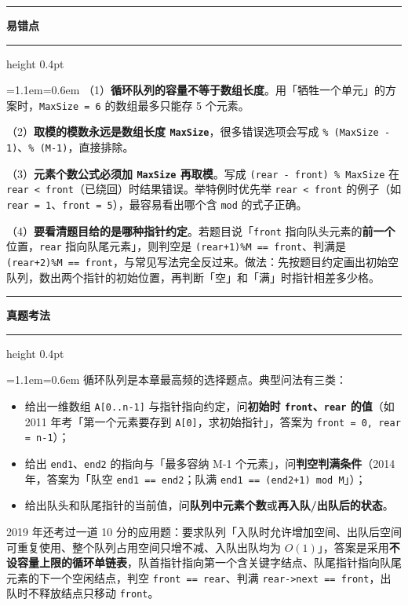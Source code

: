 \documentclass[11pt,openany,UTF8]{ctexbook}
\newcommand{\callouthead}[2]{%
  \par\addvspace{7pt}\noindent
  {\color{#1}\rule[-0.15em]{3pt}{1.05em}}\hspace{0.5em}%
  {\bfseries\color{#1}#2}\par\nobreak\vspace{-0.35em}%
  {\color{rulesep}\hrule height 0.4pt}\nobreak\vspace{0.45em}%
  \begingroup\small\setlength{\parindent}{0pt}%
  \leftskip=1.1em\rightskip=0.6em\noindent\ignorespaces}
\newcommand{\calloutend}{\par\endgroup\addvspace{7pt}}
\newenvironment{callwarn}[1]{\callouthead{warnbar}{#1}}{\calloutend}
\newenvironment{callexam}[1]{\callouthead{exambar}{#1}}{\calloutend}
\begin{document}
\begin{callwarn}{易错点}
（1）\textbf{循环队列的容量不等于数组长度}。用「牺牲一个单元」的方案时，\texttt{MaxSize =\allowbreak{} 6} 的数组最多只能存 5 个元素。

（2）\textbf{取模的模数永远是数组长度 \texttt{MaxSize}}，很多错误选项会写成 \texttt{\% (MaxSize - 1)\allowbreak{}}、\texttt{\% (M-1)\allowbreak{}}，直接排除。

（3）\textbf{元素个数公式必须加 \texttt{MaxSize} 再取模}。写成 \texttt{(rear - front)\allowbreak{} \% MaxSize} 在 \texttt{rear <\allowbreak{} front}（已绕回）时结果错误。举特例时优先举 \texttt{rear <\allowbreak{} front} 的例子（如 \texttt{rear =\allowbreak{} 1}、\texttt{front =\allowbreak{} 5}），最容易看出哪个含 \texttt{mod} 的式子正确。

（4）\textbf{要看清题目给的是哪种指针约定}。若题目说「\texttt{front} 指向队头元素的\textbf{前一个}位置，\texttt{rear} 指向队尾元素」，则判空是 \texttt{(rear+\allowbreak{}1)\allowbreak{}\%M =\allowbreak{}=\allowbreak{} front}、判满是 \texttt{(rear+\allowbreak{}2)\allowbreak{}\%M =\allowbreak{}=\allowbreak{} front}，与常见写法完全反过来。做法：先按题目约定画出初始空队列，数出两个指针的初始位置，再判断「空」和「满」时指针相差多少格。

\end{callwarn}

\begin{callexam}{真题考法}
循环队列是本章最高频的选择题点。典型问法有三类：

\begin{itemize}
\item 给出一维数组 \texttt{A[0..n-1]\allowbreak{}} 与指针指向约定，问\textbf{初始时 \texttt{front}、\texttt{rear} 的值}（如 2011 年考「第一个元素要存到 \texttt{A[0]\allowbreak{}}，求初始指针」，答案为 \texttt{front =\allowbreak{} 0,\allowbreak{} rear =\allowbreak{} n-1}）；
\item 给出 \texttt{end1}、\texttt{end2} 的指向与「最多容纳 M-1 个元素」，问\textbf{判空判满条件}（2014 年，答案为「队空 \texttt{end1 =\allowbreak{}=\allowbreak{} end2}；队满 \texttt{end1 =\allowbreak{}=\allowbreak{} (end2+\allowbreak{}1)\allowbreak{} mod M}」）；
\item 给出队头和队尾指针的当前值，问\textbf{队列中元素个数}或\textbf{再入队/出队后的状态}。
\end{itemize}
2019 年还考过一道 10 分的应用题：要求队列「入队时允许增加空间、出队后空间可重复使用、整个队列占用空间只增不减、入队出队均为 $O(1)$」，答案是采用\textbf{不设容量上限的循环单链表}，队首指针指向第一个含关键字结点、队尾指针指向队尾元素的下一个空闲结点，判空 \texttt{front =\allowbreak{}=\allowbreak{} rear}、判满 \texttt{rear->\allowbreak{}next =\allowbreak{}=\allowbreak{} front}，出队时不释放结点只移动 \texttt{front}。

\end{callexam}
\end{document}
